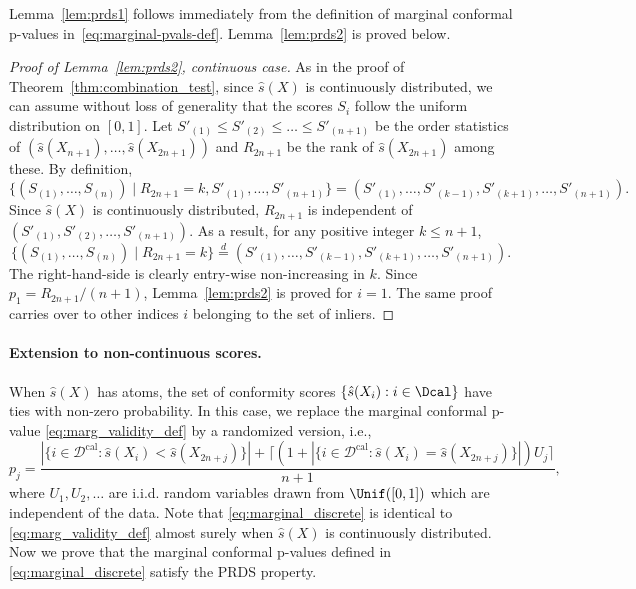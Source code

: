 Lemma~\ref{lem:prds1} follows immediately from the definition of marginal conformal p-values in~\eqref{eq:marginal-pvals-def}. Lemma~\ref{lem:prds2} is proved below.

\begin{proof}[Proof of Lemma~\ref{lem:prds2}, continuous case]
As in the proof of Theorem~\ref{thm:combination_test}, since $\hat{s}(X)$ is continuously distributed, we can assume without loss of generality that the scores $S_i$ follow the uniform distribution on $[0,1]$. Let $S'_{(1)} \le S'_{(2)}\le \ldots \le S'_{(n+1)}$ be the order statistics of $(\hat{s}(X_{n+1}), \ldots, \hat{s}(X_{2n+1}))$ and $R_{2n+1}$ be the rank of $\hat{s}(X_{2n+1})$ among these. By definition,
\[\bigg\{(S_{(1)}, \ldots, S_{(n)})\mid R_{2n+1} = k, S'_{(1)}, \ldots, S'_{(n+1)}\bigg\} = (S'_{(1)}, \ldots, S'_{(k-1)}, S'_{(k+1)}, \ldots, S'_{(n+1)}).\]
Since $\hat{s}
(X)$ is continuously distributed, $R_{2n+1}$ is independent of $(S'_{(1)}, S'_{(2)}, \ldots, S'_{(n+1)})$. As a result, for any positive integer $k \le n + 1$,
\[\bigg\{(S_{(1)}, \ldots, S_{(n)})\mid R_{2n+1} = k\bigg\}\stackrel{d}{=}(S'_{(1)}, \ldots, S'_{(k-1)}, S'_{(k+1)}, \ldots, S'_{(n+1)}).\]
The right-hand-side is clearly entry-wise non-increasing in $k$. Since $p_1 = R_{2n+1} / (n + 1)$, Lemma~\ref{lem:prds2} is proved for $i = 1$. The same proof carries over to other indices $i$ belonging to the set of inliers.

\end{proof}


\paragraph{Extension to non-continuous scores.} When $\hat{s}(X)$ has atoms, the set of conformity scores $\{\hat{s}(X_i): i\in \Dcal\}$ have ties with non-zero probability. In this case, we replace the marginal conformal p-value \eqref{eq:marg_validity_def} by a randomized version, i.e.,
\begin{equation}\label{eq:marginal_discrete}
p_j = \frac{|\{i \in \mathcal{D}^{\text{cal}} : \hat{s}(X_i) < \hat{s}(X_{2n+j})\}| + \lceil (1 + |\{i \in \mathcal{D}^{\text{cal}} : \hat{s}(X_i) = \hat{s}(X_{2n+j})\}|)U_j\rceil}{n+1},
\end{equation}
where $U_1, U_2, \ldots$ are i.i.d. random variables drawn from $\Unif([0, 1])$ which are independent of the data. Note that  \eqref{eq:marginal_discrete} is identical to \eqref{eq:marg_validity_def} almost surely when $\hat{s}(X)$ is continuously distributed. Now we prove that the marginal conformal p-values defined in \eqref{eq:marginal_discrete} satisfy the PRDS property.

